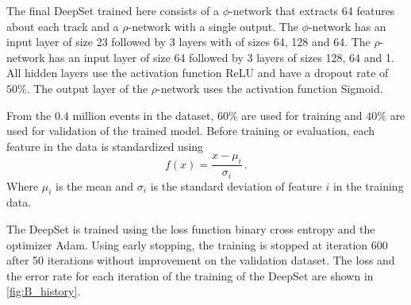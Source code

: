 The final DeepSet trained here consists of a $\phi$-network that extracts 64 features about each track and a $\rho$-network with a single output.
The $\phi$-network has an input layer of size 23 followed by 3 layers with of sizes 64, 128 and 64.
The $\rho$-network has an input layer of size 64 followed by 3 layers of sizes 128, 64 and 1.
All hidden layers use the activation function ReLU and have a dropout rate of $50\%$.
The output layer of the $\rho$-network uses the activation function Sigmoid.

From the $0.4$ million events in the dataset, $60\%$ are used for training and $40\%$ are used for validation of the trained model.
Before training or evaluation, each feature in the data is standardized using 
\begin{equation*}
    f(x) = \frac{x - \mu_i}{\sigma_i} \, .
\end{equation*} 
Where $\mu_i$ is the mean and $\sigma_i$ is the standard deviation of feature $i$ in the training data.

The DeepSet is trained using the loss function binary cross entropy and the optimizer Adam.
Using early stopping, the training is stopped at iteration 600 after 50 iterations without improvement on the validation dataset.
The loss and the error rate for each iteration of the training of the DeepSet are shown in \autoref{fig:B_history}.

